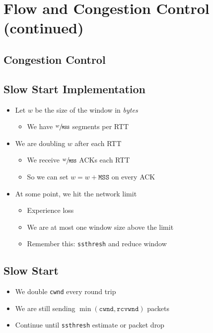 \section{Flow and Congestion Control (continued)}
\subsection{Congestion Control}
\subsection{Slow Start Implementation}
\begin{itemize}[nosep]
    \item Let $w$ be the size of the window in \emph{bytes}
          \begin{itemize}[nosep]
              \item We have $\sfrac{w}{\texttt{MSS}}$ segments per RTT
          \end{itemize}
    \item We are doubling $w$ after each RTT
          \begin{itemize}[nosep]
              \item We receive $\sfrac{w}{\texttt{MSS}}$ ACKs each RTT
              \item So we can set $w = w + \texttt{MSS}$ on every ACK
          \end{itemize}
    \item At some point, we hit the network limit
          \begin{itemize}[nosep]
              \item Experience loss
              \item We are at most one window size above the limit
              \item Remember this: \texttt{ssthresh} and reduce window
          \end{itemize}
\end{itemize}

\subsection{Slow Start}
\begin{itemize}[nosep]
    \item We double \texttt{cwnd} every round trip
    \item We are still sending $\min(\texttt{cwnd}, \texttt{rcvwnd})$ packets
    \item Continue until \texttt{ssthresh} estimate or packet drop
\end{itemize}

